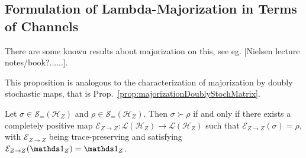 \documentclass[11pt,a4paper]{article}
\def\Hs{\mathscr{H}}%
\newcommand{\LOps}{\mathscr{L}}
\newcommand{\DOps}{\mathscr{S}_=}
\begin{document}
\subsection{Formulation of Lambda-Majorization in Terms of Channels}

There are some known results about majorization on this, see eg. [Nielsen lecture notes/book?......].

This proposition is analogous to the characterization of majorization by doubly stochastic maps, that
is Prop.~\ref{prop:majorizationDoublyStochMatrix}.
\begin{prop}
  \label{prop:MajorizationUnitalCPM}
  Let $\sigma\in\DOps(\Hs_Z)$ and $\rho\in\DOps(\Hs_Z)$. Then $\sigma\succ\rho$ if and only if
  there exists a completely positive map $\mathcal{E}_{Z\rightarrow Z} : \LOps(\Hs_Z)\rightarrow\LOps(\Hs_Z)$
  such that $\mathcal{E}_{Z\rightarrow Z}(\sigma) = \rho$, with $\mathcal{E}_{Z\rightarrow Z}$ being
  trace-preserving and satisfying $\mathcal{E}_{Z\rightarrow Z}(\Ident_Z) = \Ident_Z$.
\end{prop}
\end{document}
